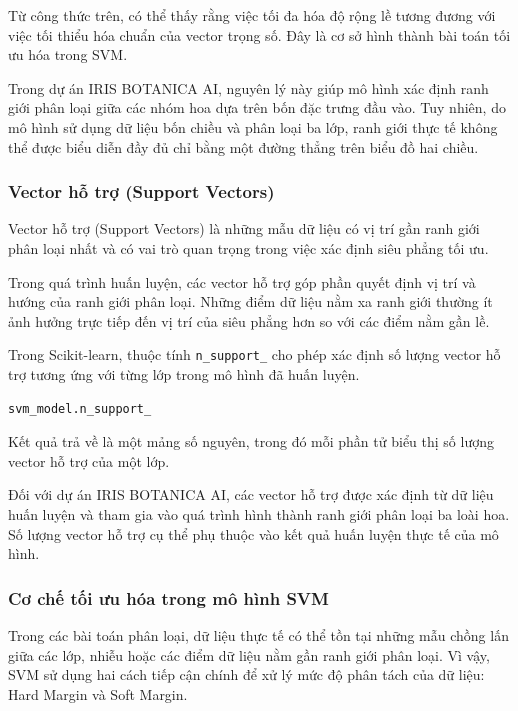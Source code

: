 \documentclass[14pt]{extarticle}
\begin{document}
	\noindent
	Từ công thức trên, có thể thấy rằng việc tối đa hóa độ rộng lề tương đương với việc tối thiểu hóa chuẩn của vector trọng số. Đây là cơ sở hình thành bài toán tối ưu hóa trong SVM.
	
	\noindent
	Trong dự án IRIS BOTANICA AI, nguyên lý này giúp mô hình xác định ranh giới phân loại giữa các nhóm hoa dựa trên bốn đặc trưng đầu vào. Tuy nhiên, do mô hình sử dụng dữ liệu bốn chiều và phân loại ba lớp, ranh giới thực tế không thể được biểu diễn đầy đủ chỉ bằng một đường thẳng trên biểu đồ hai chiều.
		\subsubsection{Vector hỗ trợ (Support Vectors)}
		\noindent
		Vector hỗ trợ (Support Vectors) là những mẫu dữ liệu có vị trí gần ranh giới phân loại nhất và có vai trò quan trọng trong việc xác định siêu phẳng tối ưu.
		
		\noindent
		Trong quá trình huấn luyện, các vector hỗ trợ góp phần quyết định vị trí và hướng của ranh giới phân loại. Những điểm dữ liệu nằm xa ranh giới thường ít ảnh hưởng trực tiếp đến vị trí của siêu phẳng hơn so với các điểm nằm gần lề.
		
		\noindent
		Trong Scikit-learn, thuộc tính \texttt{n\_support\_} cho phép xác định số lượng vector hỗ trợ tương ứng với từng lớp trong mô hình đã huấn luyện.
		
		\begin{lstlisting}[language=Python]
			svm_model.n_support_
		\end{lstlisting}
		
		\noindent
		Kết quả trả về là một mảng số nguyên, trong đó mỗi phần tử biểu thị số lượng vector hỗ trợ của một lớp.
		
		\noindent
		Đối với dự án IRIS BOTANICA AI, các vector hỗ trợ được xác định từ dữ liệu huấn luyện và tham gia vào quá trình hình thành ranh giới phân loại ba loài hoa. Số lượng vector hỗ trợ cụ thể phụ thuộc vào kết quả huấn luyện thực tế của mô hình.
		
		\subsubsection{Cơ chế tối ưu hóa trong mô hình SVM}
		
		\noindent Trong các bài toán phân loại, dữ liệu thực tế có thể tồn tại những mẫu chồng lấn giữa các lớp, nhiễu hoặc các điểm dữ liệu nằm gần ranh giới phân loại. Vì vậy, SVM sử dụng hai cách tiếp cận chính để xử lý mức độ phân tách của dữ liệu: Hard Margin và Soft Margin.\\
		
\end{document}
